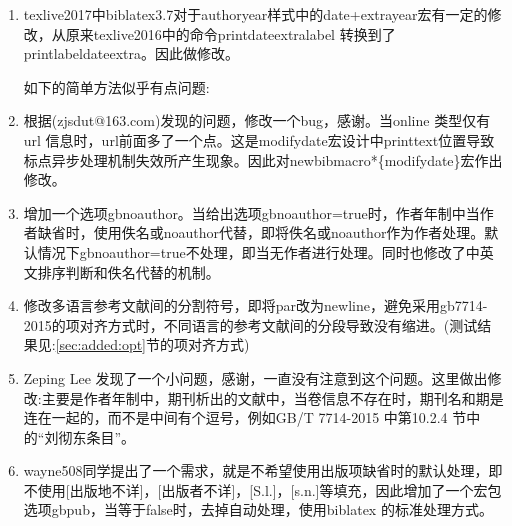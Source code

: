 \label{up:170411}
\begin{enumerate}
\item texlive2017中biblatex3.7对于authoryear样式中的date+extrayear宏有一定的修改，从原来texlive2016中的命令printdateextralabel 转换到了printlabeldateextra。因此做修改。

    如下的简单方法似乎有点问题:
    \begin{texlist}
    \let\printdateextralabel=\printlabeldateextra
    \end{texlist}

\item 根据(zjsdut@163.com)发现的问题，修改一个bug，感谢。当online 类型仅有url 信息时，url前面多了一个点。这是modifydate宏设计中printtext位置导致标点异步处理机制失效所产生现象。因此对newbibmacro*\{modifydate\}宏作出修改。

\item 增加一个选项gbnoauthor。当给出选项gbnoauthor=true时，作者年制中当作者缺省时，使用佚名或noauthor代替，即将佚名或noauthor作为作者处理。默认情况下gbnoauthor=true不处理，即当无作者进行处理。同时也修改了中英文排序判断和佚名代替的机制。

\item 修改多语言参考文献间的分割符号，即将par改为newline，避免采用gb7714-2015的项对齐方式时，不同语言的参考文献间的分段导致没有缩进。(测试结果见:\ref{sec:added:opt}节的项对齐方式)

    \begin{texlist}
    \renewcommand*{\entrysetpunct}{\adddot\newline\nobreak}
    \end{texlist}

\item Zeping Lee 发现了一个小问题，感谢，一直没有注意到这个问题。这里做出修改:主要是作者年制中，期刊析出的文献中，当卷信息不存在时，期刊名和期是连在一起的，而不是中间有个逗号，例如GB/T 7714-2015 中第10.2.4 节中的“刘彻东条目”。

\item wayne508同学提出了一个需求，就是不希望使用出版项缺省时的默认处理，即不使用[出版地不详]，[出版者不详]，[S.l.]，[s.n.]等填充，因此增加了一个宏包选项gbpub，当等于false时，去掉自动处理，使用biblatex 的标准处理方式。

\end{enumerate}

